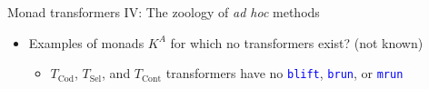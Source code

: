 \documentclass[english]{beamer}
\begin{document}
\begin{frame}{Monad transformers IV: The zoology of \emph{ad hoc} methods}
\begin{itemize}
\begin{itemize}
\item {\footnotesize{}$T_{\text{State}}^{M,A}=S\Rightarrow M^{S\times A}$};
{\footnotesize{}$T_{\text{Cont}}^{M,A}=\left(A\Rightarrow M^{R}\right)\Rightarrow M^{R}$};
``selector'' {\footnotesize{}$F^{A\Rightarrow P^{Q}}\Rightarrow P^{A}$}
-- transformer $F^{A\Rightarrow T_{P}^{M,Q}}\Rightarrow T_{P}^{M,A}$;
codensity {\footnotesize{}$\forall R.\left(A\Rightarrow M^{R}\right)\Rightarrow M^{R}$}{\footnotesize\par}
\end{itemize}
\item Examples of monads $K^{A}$ for which no transformers exist? (not
known)
\begin{itemize}
\item {\footnotesize{}\vspace{-0.4cm}}$T_{\text{Cod}}$, $T_{\text{Sel}}$,
and $T_{\text{Cont}}$ transformers have no \texttt{\textcolor{blue}{\footnotesize{}blift}},
\texttt{\textcolor{blue}{\footnotesize{}brun}}, or \texttt{\textcolor{blue}{\footnotesize{}mrun}} 
\end{itemize}
\end{itemize}
\end{frame}
\end{document}
